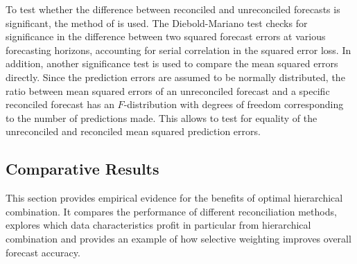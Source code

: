 \documentclass[a4paper,fleqn,11pt]{article}
\begin{document}
To test whether the difference between reconciled and unreconciled forecasts is significant, the method of \cite{Diebold1995} is used. The Diebold-Mariano test checks for significance in the difference between two squared forecast errors at various forecasting horizons, accounting for serial correlation in the squared error loss. In addition, another significance test is used to compare the mean squared errors directly. Since the prediction errors are assumed to be normally distributed, the ratio between mean squared errors of an unreconciled forecast and a specific reconciled forecast has an $F$-distribution with degrees of freedom corresponding to the number of predictions made. This allows to test for equality of the unreconciled and reconciled mean squared prediction errors.\\


\subsection{Comparative Results}
This section provides empirical evidence for the benefits of optimal hierarchical combination. It compares the performance of different reconciliation methods, explores which data characteristics profit in particular from hierarchical combination and provides an example of how selective weighting improves overall forecast accuracy.

\clearpage
 
\end{document}
